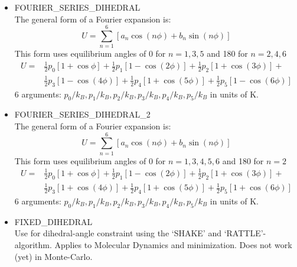 \begin{itemize}
  \item{FOURIER\_SERIES\_DIHEDRAL}\\
  The general form of a Fourier expansion is:
  \begin{equation}
  U=\sum_{n=1}^6\left[a_n\cos\left(n\phi\right)+b_n\sin\left(n\phi\right)\right]
  \end{equation}
  This form uses equilibrium angles of 0 for $n=1,3,5$ and 180 for $n=2,4,6$
  \begin{equation}
  \begin{split}
  U=&\frac{1}{2}p_0\left[1+\cos\phi\right]+
    \frac{1}{2}p_1\left[1-\cos\left(2\phi\right)\right]+
    \frac{1}{2}p_2\left[1+\cos\left(3\phi\right)\right]+\\
    &\frac{1}{2}p_3\left[1-\cos\left(4\phi\right)\right]+
    \frac{1}{2}p_4\left[1+\cos\left(5\phi\right)\right]+
    \frac{1}{2}p_5\left[1-\cos\left(6\phi\right)\right]
  \end{split}
  \end{equation}
  6 arguments: $p_0/k_B,p_1/k_B,p_2/k_B,p_3/k_B,p_4/k_B,p_5/k_B$ in units of K.

  \item{FOURIER\_SERIES\_DIHEDRAL\_2}\\
  The general form of a Fourier expansion is:
  \begin{equation}
  U=\sum_{n=1}^6\left[a_n\cos\left(n\phi\right)+b_n\sin\left(n\phi\right)\right]
  \end{equation}
  This form uses equilibrium angles of 0 for $n=1,3,4,5,6$ and 180 for $n=2$
  \begin{equation}
  \begin{split}
  U=&\frac{1}{2}p_0\left[1+\cos\phi\right]+
    \frac{1}{2}p_1\left[1-\cos\left(2\phi\right)\right]+
    \frac{1}{2}p_2\left[1+\cos\left(3\phi\right)\right]+\\
    &\frac{1}{2}p_3\left[1+\cos\left(4\phi\right)\right]+
    \frac{1}{2}p_4\left[1+\cos\left(5\phi\right)\right]+
    \frac{1}{2}p_5\left[1+\cos\left(6\phi\right)\right]
  \end{split}
  \end{equation}
  6 arguments: $p_0/k_B,p_1/k_B,p_2/k_B,p_3/k_B,p_4/k_B,p_5/k_B$ in units of K.

  \item{FIXED\_DIHEDRAL}\\
   Use for dihedral-angle constraint using the `SHAKE' and `RATTLE'-algorithm. 
   Applies to Molecular Dynamics and minimization. Does not work (yet) in Monte-Carlo.
\end{itemize}

